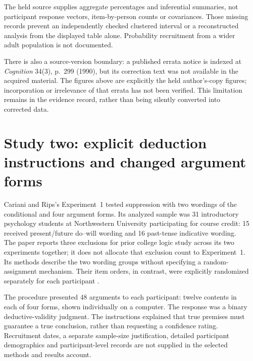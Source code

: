 The held source supplies aggregate percentages and inferential summaries,
not participant response vectors, item-by-person counts or covariances.
Those missing records prevent an independently checked clustered interval
or a reconstructed analysis from the displayed table alone. Probability
recruitment from a wider adult population is not documented.

There is also a source-version boundary: a published errata notice is
indexed at \emph{Cognition} 34(3), p.~299 (1990), but its correction text
was not available in the acquired material. The figures above are explicitly
the held author's-copy figures; incorporation or irrelevance of that errata
has not been verified. This limitation remains in the evidence record,
rather than being silently converted into corrected data.

\section{Study two: explicit deduction instructions and changed argument forms}
\label{sec:p19-cariani-rips-suppression-study}

Cariani and Rips's Experiment~1 tested suppression with two wordings of
the conditional and four argument forms. Its analyzed sample was 31
introductory psychology students at Northwestern University participating
for course credit: 15 received present/future do--will wording and 16
past-tense indicative wording. The paper reports three exclusions for
prior college logic study across its two experiments together; it does
not allocate that exclusion count to Experiment~1. Its methods describe
the two wording groups without specifying a random-assignment mechanism.
Their item orders, in contrast, were explicitly randomized separately
for each participant \cite[Sec.~2.3]{CarianiRips2017Suppression}.

The procedure presented 48 arguments to each participant: twelve
contents in each of four forms, shown individually on a computer.
The response was a binary deductive-validity judgment. The instructions
explained that true premises must guarantee a true conclusion, rather
than requesting a confidence rating. Recruitment dates, a separate
sample-size justification, detailed participant demographics and
participant-level records are not supplied in the selected methods
and results account.

